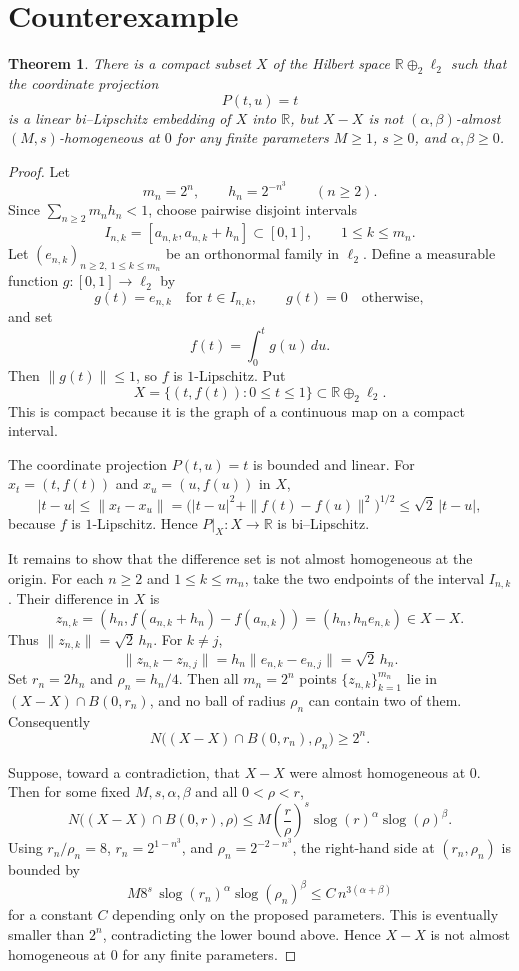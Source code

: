 \documentclass[11pt]{article}
\newtheorem*{theorem}{Theorem}
\newcommand{\slog}{\operatorname{slog}}
\newcommand{\R}{\mathbb R}
\begin{document}
\section*{Counterexample}

\begin{theorem}
There is a compact subset \(X\) of the Hilbert space
\(\R\oplus_2\ell_2\) such that the coordinate projection
\[
  P(t,u)=t
\]
is a linear bi--Lipschitz embedding of \(X\) into \(\R\), but \(X-X\) is not
\((\alpha,\beta)\)-almost \((M,s)\)-homogeneous at \(0\) for any finite
parameters \(M\geq 1\), \(s\geq 0\), and \(\alpha,\beta\geq 0\).
\end{theorem}

\begin{proof}
Let
\[
  m_n=2^n,\qquad h_n=2^{-n^3}\qquad (n\geq 2).
\]
Since \(\sum_{n\geq 2}m_nh_n<1\), choose pairwise disjoint intervals
\[
  I_{n,k}=[a_{n,k},a_{n,k}+h_n]\subset [0,1],
  \qquad 1\leq k\leq m_n.
\]
Let \((e_{n,k})_{n\geq2,\ 1\leq k\leq m_n}\) be an orthonormal family in
\(\ell_2\). Define a measurable function \(g:[0,1]\to\ell_2\) by
\[
  g(t)=e_{n,k}\quad\text{for }t\in I_{n,k},\qquad
  g(t)=0\quad\text{otherwise},
\]
and set
\[
  f(t)=\int_0^t g(u)\,du.
\]
Then \(\|g(t)\|\leq 1\), so \(f\) is \(1\)-Lipschitz. Put
\[
  X=\{(t,f(t)):0\leq t\leq 1\}\subset \R\oplus_2\ell_2.
\]
This is compact because it is the graph of a continuous map on a compact
interval.

The coordinate projection \(P(t,u)=t\) is bounded and linear. For
\(x_t=(t,f(t))\) and \(x_u=(u,f(u))\) in \(X\),
\[
  |t-u|\leq \|x_t-x_u\|
  =\big(|t-u|^2+\|f(t)-f(u)\|^2\big)^{1/2}
  \leq \sqrt{2}\,|t-u|,
\]
because \(f\) is \(1\)-Lipschitz. Hence \(P|_X:X\to\R\) is bi--Lipschitz.

It remains to show that the difference set is not almost homogeneous at the
origin. For each \(n\geq2\) and \(1\leq k\leq m_n\), take the two endpoints of
the interval \(I_{n,k}\). Their difference in \(X\) is
\[
  z_{n,k}
  = (h_n, f(a_{n,k}+h_n)-f(a_{n,k}))
  = (h_n,h_ne_{n,k})\in X-X.
\]
Thus \(\|z_{n,k}\|=\sqrt2\,h_n\). For \(k\neq j\),
\[
  \|z_{n,k}-z_{n,j}\|
  =h_n\|e_{n,k}-e_{n,j}\|
  =\sqrt2\,h_n.
\]
Set \(r_n=2h_n\) and \(\rho_n=h_n/4\). Then all \(m_n=2^n\) points
\(\{z_{n,k}\}_{k=1}^{m_n}\) lie in \((X-X)\cap B(0,r_n)\), and no ball of
radius \(\rho_n\) can contain two of them. Consequently
\[
  N\big((X-X)\cap B(0,r_n),\rho_n\big)\geq 2^n.
\]

Suppose, toward a contradiction, that \(X-X\) were almost homogeneous at \(0\).
Then for some fixed \(M,s,\alpha,\beta\) and all \(0<\rho<r\),
\[
  N\big((X-X)\cap B(0,r),\rho\big)
  \leq M\left(\frac r\rho\right)^s\slog(r)^\alpha\slog(\rho)^\beta.
\]
Using \(r_n/\rho_n=8\), \(r_n=2^{1-n^3}\), and \(\rho_n=2^{-2-n^3}\), the
right-hand side at \((r_n,\rho_n)\) is bounded by
\[
  M8^s\,\slog(r_n)^\alpha\slog(\rho_n)^\beta
  \leq C\,n^{3(\alpha+\beta)}
\]
for a constant \(C\) depending only on the proposed parameters. This is
eventually smaller than \(2^n\), contradicting the lower bound above. Hence
\(X-X\) is not almost homogeneous at \(0\) for any finite parameters.
\end{proof}
\end{document}
